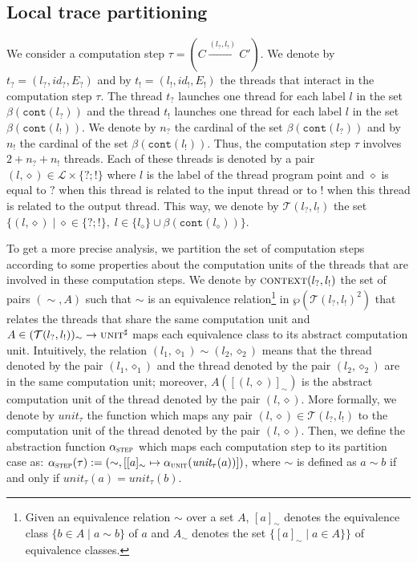 \documentclass{article}
\newcommand{\bydef}{:=}
\newcommand{\Labels}{\mathcal{L}}
\newcommand{\rec}{?}
\newcommand{\eme}{!}
\newcommand{\prolabel}{\Labels}
\newcommand{\nonstan}[1]{\overset{\scriptscriptstyle{#1}}{\scriptstyle \longrightarrow}}
\newcommand{\cont}{\texttt{cont}}
\newcommand{\lrec}{l_{\rec}}
\newcommand{\leme}{l_{\eme}}
\newcommand{\idrec}{\textit{id}_{\rec}}
\newcommand{\ideme}{\textit{id}_{\eme}}
\newcommand{\Erec}{E_{\rec}}
\newcommand{\Eeme}{E_{\eme}}
\newcommand{\trec}{t_{\rec}}
\newcommand{\ttuplerec}{(\lrec,\idrec,\Erec)}
\newcommand{\teme}{t_{\eme}}
\newcommand{\ttupleeme}{(\leme,\ideme,\Eeme)}
\newcommand{\piunit}{\alpha_\computationunit}
\newcommand{\computationunit}{\textsc{unit}}
\newcommand{\abstractunit}{\textsc{unit}^{\sharp}}
\begin{document}
\subsection{Local trace partitioning}
\newcommand{\vartrans}{\mathcal{T}(\lrec,\leme)}
We consider a computation step $\tau=(C\nonstan{(\lrec,\leme)} C')$. We denote by $\trec=\ttuplerec$ and by $\teme=\ttupleeme$ the threads that interact in the computation step $\tau$. 
The thread $\trec$ launches one thread for each label  $l$ in the set $\beta(\cont(\lrec))$ and the thread $\teme$ launches  one thread for each label $l$ in the set $\beta(\cont(\leme))$. We denote by $n_{\rec}$ the cardinal of the set $\beta(\cont(\lrec))$ and by $n_{\eme}$ the cardinal of the set $\beta(\cont(\leme))$. 
Thus, the computation step $\tau$ involves $2+n_{\rec}+n_{\eme}$ threads. 
Each of these threads is denoted by a pair $(l,\diamond)\in\prolabel\times \{\rec;\eme\}$ where $l$ is the label of the thread program point and $\diamond$ is equal to $\rec$ when this thread is related to the input  thread or to $\eme$ when this thread is related to the output thread. This way, we denote by $\vartrans$
 the set $\{(l,\diamond)\;|\;\diamond\in\{\rec;\eme\},\;l\in\{l_\diamond\}\cup\beta(\cont(l_\diamond))\}$. 
\newcommand{\abstractcontext}{\textsc{context}}
\newcommand{\classes}{(\vartrans)_{\sim}}
\newcommand{\classede}[1]{[#1]_{\sim}}

To get a more precise analysis, 
we partition the set of computation steps according to some properties about the computation units of the threads that are involved in these computation steps.
We denote by $\abstractcontext(\lrec,\leme)$ the set of pairs $(\sim,A)$ such that $\sim$ is an equivalence relation\footnote{Given an equivalence relation $\sim$ over a set $A$, $[a]_{\sim}$ denotes the equivalence class $\{b\in A\;|\;a\sim b\}$ of  $a$ and $A_{\sim}$ denotes the set $\{[a]_\sim\;|\;a\in A\}\}$ of equivalence classes.}  in $\wp(\vartrans^2)$ that relates the threads that share the same computation unit  and $A\in \classes \rightarrow \abstractunit$ maps each equivalence class to its abstract computation unit.
Intuitively, the relation $(l_1,\diamond_1)\sim (l_2,\diamond_2)$ means that the thread denoted by the pair $(l_1,\diamond_1)$ and the thread denoted by the pair $(l_2,\diamond_2)$ are in the same computation unit; moreover, $A([(l,\diamond)]_{\sim})$ is the abstract computation unit of the thread denoted by the pair $(l,\diamond)$. 
More formally, we denote by $\textit{unit}_{\tau}$ the function which maps any pair $(l,\diamond)\in\vartrans$ to the computation unit of the thread denoted by the pair $(l,\diamond)$.
Then, we define the abstraction function $\alpha_{\textsc{step}}$ which  maps each computation step to its partition case as: 
$\alpha_{\textsc{step}}(\tau) \bydef (\sim,[[a]_{\sim} \mapsto \piunit(\textit{unit}_{\tau}(a))])$, 
where $\sim$ is defined as $a\sim  b$ if and only if $\textit{unit}_{\tau}(a)=\textit{unit}_{\tau}(b)$.
\end{document}
